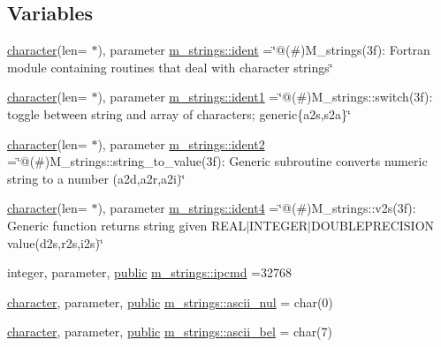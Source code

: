 \subsection*{Variables}
\begin{DoxyCompactItemize}
\item 
\hyperlink{option__stopwatch_83_8txt_abd4b21fbbd175834027b5224bfe97e66}{character}(len= $\ast$), parameter \hyperlink{namespacem__strings_a1a9ef3b9018fa526c23873b95f53768f}{m\+\_\+strings\+::ident} =\char`\"{}@(\#)M\+\_\+strings(3f)\+: Fortran module containing routines that deal with character strings\char`\"{}
\item 
\hyperlink{option__stopwatch_83_8txt_abd4b21fbbd175834027b5224bfe97e66}{character}(len= $\ast$), parameter \hyperlink{namespacem__strings_a13ee1b22ec4a8cb9c2137864495421d3}{m\+\_\+strings\+::ident1} =\char`\"{}@(\#)M\+\_\+strings\+::switch(3f)\+: toggle between string and array of characters; generic\{a2s,s2a\}\char`\"{}
\item 
\hyperlink{option__stopwatch_83_8txt_abd4b21fbbd175834027b5224bfe97e66}{character}(len= $\ast$), parameter \hyperlink{namespacem__strings_ab6570916910af932896de93e4792cf46}{m\+\_\+strings\+::ident2} =\char`\"{}@(\#)M\+\_\+strings\+::string\+\_\+to\+\_\+value(3f)\+: Generic subroutine converts numeric string to a number (a2d,a2r,a2i)\char`\"{}
\item 
\hyperlink{option__stopwatch_83_8txt_abd4b21fbbd175834027b5224bfe97e66}{character}(len= $\ast$), parameter \hyperlink{namespacem__strings_a19b07bcbc88c40854caf542d11f72cd0}{m\+\_\+strings\+::ident4} =\char`\"{}@(\#)M\+\_\+strings\+::v2s(3f)\+: Generic function returns string given R\+E\+A\+L$\vert$\+I\+N\+T\+E\+G\+E\+R$\vert$\+D\+O\+U\+B\+L\+E\+P\+R\+E\+C\+I\+S\+I\+O\+N value(d2s,r2s,i2s)\char`\"{}
\item 
integer, parameter, \hyperlink{M__stopwatch_83_8txt_a2f74811300c361e53b430611a7d1769f}{public} \hyperlink{namespacem__strings_a40ffeae8c41d579efd77648ffc3d9a19}{m\+\_\+strings\+::ipcmd} =32768
\item 
\hyperlink{option__stopwatch_83_8txt_abd4b21fbbd175834027b5224bfe97e66}{character}, parameter, \hyperlink{M__stopwatch_83_8txt_a2f74811300c361e53b430611a7d1769f}{public} \hyperlink{namespacem__strings_a9de5098e31c6411a43323b1d7f19a886}{m\+\_\+strings\+::ascii\+\_\+nul} = char(0)
\item 
\hyperlink{option__stopwatch_83_8txt_abd4b21fbbd175834027b5224bfe97e66}{character}, parameter, \hyperlink{M__stopwatch_83_8txt_a2f74811300c361e53b430611a7d1769f}{public} \hyperlink{namespacem__strings_ae939ea755cfa377c5ed5f09ba8b0e923}{m\+\_\+strings\+::ascii\+\_\+bel} = char(7)

\end{DoxyCompactItemize}
